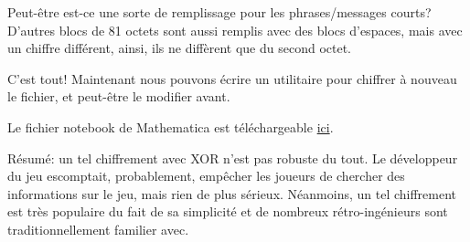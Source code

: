 Peut-être est-ce une sorte de remplissage pour les phrases/messages courts?
D'autres blocs de 81 octets sont aussi remplis avec des blocs d'espaces, mais avec
un chiffre différent, ainsi, ils ne diffèrent que du second octet.

C'est tout! Maintenant nous pouvons écrire un utilitaire pour chiffrer à nouveau le
fichier, et peut-être le modifier avant.

Le fichier notebook de Mathematica est téléchargeable 
\href{\GitHubBlobMasterURL/ff/XOR/mask_1/files/XOR_mask_1.nb}{ici}.

Résumé: un tel chiffrement avec XOR n'est pas robuste du tout. Le développeur du jeu
escomptait, probablement, empêcher les joueurs de chercher des informations sur le
jeu, mais rien de plus sérieux.
Néanmoins, un tel chiffrement est très populaire du fait de sa simplicité et de nombreux
rétro-ingénieurs sont traditionnellement familier avec.

